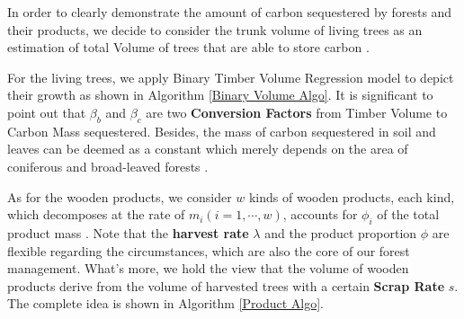\documentclass{mcmthesis}
\numberwithin{figure}{section}
\numberwithin{table}{section}
\numberwithin{equation}{section}
\begin{document}
In order to clearly demonstrate the amount of carbon sequestered by forests and their
products, we decide to consider the trunk volume of living trees as an estimation of 
total Volume of trees that are able to store carbon \citep{WangYan}. 
\par
For the living trees, we apply Binary Timber Volume Regression model \citep{LuoQingbang} 
to depict their growth as shown in Algorithm \ref{Binary Volume Algo}. 
It is significant
to point out that $ \beta_b $ and $ \beta_c $ are two \textbf{Conversion Factors} from
Timber Volume to Carbon Mass sequestered. Besides, the mass of carbon sequestered in
soil and leaves can be deemed as a constant which merely depends on the area
of coniferous and broad-leaved forests \citep{YanDeren2011}. 
\par
As for the wooden products, we consider $ w $ kinds of wooden products, each kind,
which decomposes at the rate of $ m_i (i = 1,\cdots, w) $, accounts for $ \phi_i$ 
of the total product mass \citep{2006Forest}. Note that the \textbf{harvest rate} $ \lambda $ and the product
proportion $ \phi $ are flexible regarding the circumstances, which are also 
the core of our forest management. What's more, we hold the view that 
the volume of wooden products derive from the volume of harvested trees with a certain
\textbf{Scrap Rate} $ s $. The complete idea is shown in Algorithm \ref{Product Algo}.
\par
\end{document}
